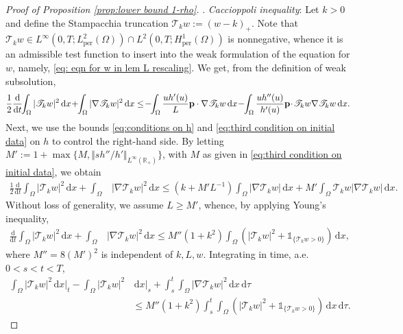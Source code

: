 \documentclass[11pt,a4paper,reqno]{amsart}
\theoremstyle{remark}
\theoremstyle{definition}
\numberwithin{equation}{section}
\newcommand{\per}{\mathrm{per}}
\newcommand{\p}{{\bf p}}
\renewcommand{\d}{\, \mathrm{d} }
\newcommand{\der}{\mathrm{d}}
\begin{document}
\begin{proof}[Proof of Proposition \ref{prop:lower bound 1-rho}]
  . \textit{Caccioppoli inequality}: Let $k > 0$ and define the Stampacchia truncation $\mathscr{T}_k w := (w-k)_+$. Note that $\mathscr{T}_k w \in L^\infty(0,T;L^2_\per(\Omega)) \cap L^2(0,T;H^1_\per(\Omega))$ is nonnegative, whence it is an admissible test function to insert into the weak formulation of the equation for $w$, namely, \eqref{eq: eqn for w in lem L rescaling}. We get, from the definition of weak subsolution, 
    \begin{equation*}
        \begin{aligned}
            \frac{1}{2}\frac{\der}{\der t}\!\!\int_{\Omega} |\mathscr{T}_k w|^2 \d x\! +\!\!\int_{\Omega} |\nabla \mathscr{T}_k w|^2 \d x \leq \!-\!\!\int_{\Omega} \frac{u h'(u)}{L} \p \cdot \nabla \mathscr{T}_k w \d x \! -\!\! \int_\Omega \frac{u h''(u)}{h'(u)}\p\!\cdot\! \mathscr{T}_k w\nabla \mathscr{T}_k w \d x.  
        \end{aligned}
    \end{equation*}
Next, we use the bounds \eqref{eq:conditions on h} and \eqref{eq:third condition on initial data} on $h$ to control the right-hand side. By letting $M' := 1+\max\{M, \Vert s h''/h'
 \Vert_{L^\infty(\mathbb{R}_+)}\}$, with $M$ as given in \eqref{eq:third condition on initial data}, we obtain 
      \begin{equation*}
        \begin{aligned}
            \frac{1}{2}\frac{\der}{\der t}\!\int_{\Omega} |\mathscr{T}_k w|^2 \d x\! +\!\!\int_{\Omega} & |\nabla \mathscr{T}_k w|^2 \d x \leq ( k + M' L^{-1} )\!\int_{\Omega} |\nabla \mathscr{T}_k w| \d x \! + M'\!\int_\Omega \mathscr{T}_k w |\nabla \mathscr{T}_k w| \d x. 
        \end{aligned}
    \end{equation*}
Without loss of generality, we assume $L \geq M'$, whence, by applying Young's inequality, 
      \begin{equation*}
        \begin{aligned}
            \frac{\der}{\der t}\!\int_{\Omega} |\mathscr{T}_k w|^2 \d x + \int_{\Omega} & |\nabla \mathscr{T}_k w|^2 \d x \leq M''( 1+k^2) \int_\Omega ( |\mathscr{T}_k w |^2 + \mathds{1}_{\{\mathscr{T}_k w > 0\}}) \d x, 
        \end{aligned}
    \end{equation*}
where $M'' = 8(M')^2$ is independent of $k,L,w$. Integrating in time, a.e.~$0<s<t<T$, 
\begin{equation}\label{eq:caccioppoli for w}
            \begin{aligned}
            \int_{\Omega} |\mathscr{T}_k w|^2 \d x\bigg|_{t} - \int_{\Omega} |\mathscr{T}_k w|^2 & \d x\bigg|_{s} + \int_s^t \int_{\Omega} |\nabla \mathscr{T}_k w |^2 \d x \d \tau \\ 
            &\leq M''(1+k^2) \int_s^t \int_{\Omega}(|\mathscr{T}_k w|^2 + \mathds{1}_{\{\mathscr{T}_k w>0\}}) \d x \d \tau. 
        \end{aligned}
\end{equation}




\end{proof}
\end{document}

